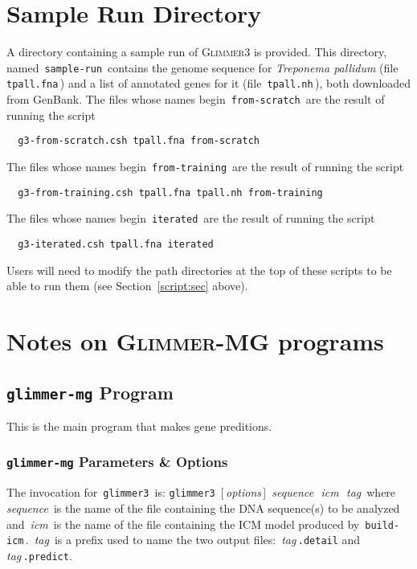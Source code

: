 \documentclass[fleqn,titlepage,11pt]{article}
\def\Desc#1{\,\mbox{\emph{#1}}\,}
\def\Gthree{\textsc{Glimmer3}}
\def\Gmg{\textsc{Glimmer-MG}}
\def\Pg#1{\texttt{#1}}
\begin{document}
\section{Sample Run Directory}

A directory containing a sample run of \Gthree{} is provided.
This directory, named \,\Pg{sample-run}\, contains the genome sequence
for \emph{Treponema pallidum} (file \,\Pg{tpall.fna}\,)
and a list of annotated genes for it (file \,\Pg{tpall.nh}\,),
both downloaded from GenBank.
The files whose names begin \,\Pg{from-scratch}\, are the result of
running the script
\BSV
\begin{verbatim}
  g3-from-scratch.csh tpall.fna from-scratch
\end{verbatim}
\ESV
The files whose names begin \,\Pg{from-training}\, are the result of
running the script
\BSV
\begin{verbatim}
  g3-from-training.csh tpall.fna tpall.nh from-training
\end{verbatim}
\ESV
The files whose names begin \,\Pg{iterated}\, are the result of
running the script
\BSV
\begin{verbatim}
  g3-iterated.csh tpall.fna iterated
\end{verbatim}
\ESV
Users will need to modify the path directories at the top of these
scripts to be able to run them (see Section~\ref{script:sec} above).

\section{Notes on \Gmg{} programs}
\subsection{\Pg{glimmer-mg} Program}

This is the main program that makes gene preditions.

\subsubsection{\Pg{glimmer-mg} Parameters \& Options}
The invocation for \,\Pg{glimmer3}\, is:
\bq
  \Pg{glimmer3}\, [\Desc{options}] \Desc{sequence} \Desc{icm} \Desc{tag}
\eq
where \Desc{sequence} is the name of the file containing the DNA
sequence(s) to be analyzed and \Desc{icm} is the name of the file
containing the ICM model produced by \,\verb`build-icm`\,.  \Desc{tag}
is a prefix used to name the two output files:  \Desc{tag}\verb`.detail`
and \Desc{tag}\verb`.predict`.
\end{document}
